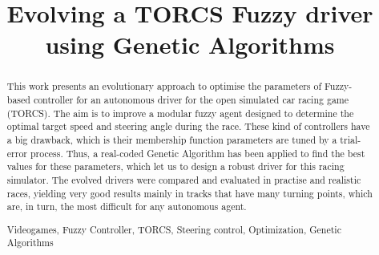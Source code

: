 \documentclass[runningheads,a4paper]{llncs}
\newcommand{\keywords}[1]{\par\addvspace\baselineskip
	\noindent\keywordname\enspace\ignorespaces#1}
\begin{document}
	
	\mainmatter  %
	
	\title{Evolving a TORCS Fuzzy driver using Genetic Algorithms}
	
	
	
	
	
	
	
	
	

	
	\maketitle
	\begin{abstract}
		
		This work presents an evolutionary approach to optimise the parameters of Fuzzy-based controller for an autonomous driver for the open simulated car racing game (TORCS). The aim is to improve a modular fuzzy agent designed to determine the optimal target speed and steering angle during the race.
These kind of controllers have a big drawback, which is their membership function parameters are tuned by a trial-error process.
Thus, a real-coded Genetic Algorithm 
has been applied to find the best values for these parameters, which let us to design a robust driver for this racing simulator.
The evolved drivers were compared and  evaluated in practise and realistic races, yielding very good results mainly in tracks that have many turning points, which are, in turn, the most difficult for any autonomous agent.
	\keywords{Videogames, Fuzzy Controller, TORCS, Steering control, Optimization, Genetic Algorithms}
	\end{abstract}
\end{document}
